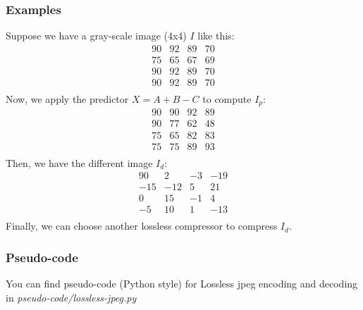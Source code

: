 \subsubsection*{Examples}
Suppose we have a gray-scale image (4x4) $I$ like this:
\begin{equation*}
\begin{matrix}
90 & 92 & 89 & 70\\
75 & 65 & 67 & 69\\
90 & 92 & 89 & 70\\
90 & 92 & 89 & 70\\
\end{matrix}
\end{equation*}
Now, we apply the predictor $X = A + B - C$ to compute $I_p$:
\begin{equation*}
\begin{matrix}
90 & 90 & 92 & 89\\
90 & 77 & 62 & 48\\
75 & 65 & 82 & 83\\
75 & 75 & 89 & 93\\
\end{matrix}
\end{equation*}
Then, we have the different image $I_d$:
\begin{equation*}
\begin{matrix}
90 & 2 & -3 & -19\\
-15 & -12 & 5 & 21\\
0 & 15 & -1 & 4\\
-5 & 10 & 1 & -13\\
\end{matrix}
\end{equation*}
Finally, we can choose another lossless compressor to compress $I_d$.
\subsubsection*{Pseudo-code}
You can find pseudo-code (Python style) for Lossless jpeg encoding and decoding in \textit{pseudo-code/lossless-jpeg.py}
